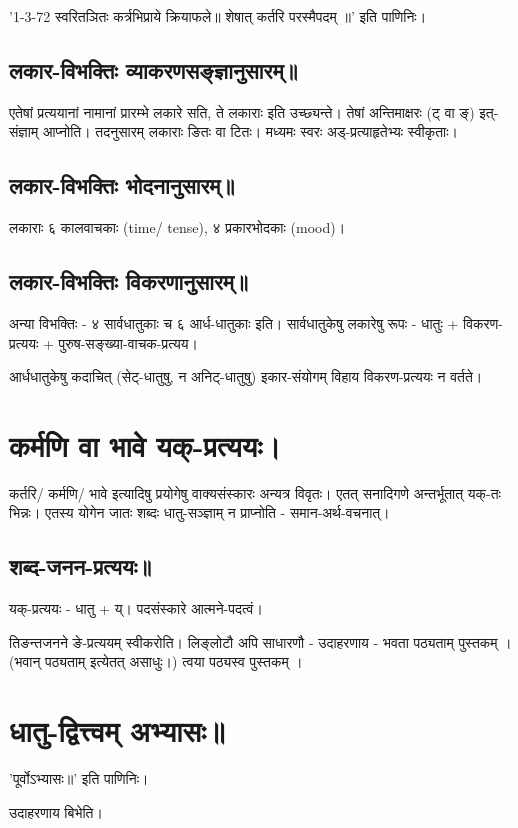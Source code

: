\documentclass[oneside, article]{memoir}
\begin{document}
'1-3-72 स्वरितञितः कर्त्रभिप्राये क्रियाफले॥ शेषात् कर्तरि परस्मैपदम् ॥' इति पाणिनिः।

\subsection{लकार-विभक्तिः व्याकरणसङ्ज्ञानुसारम्॥}
एतेषां प्रत्ययानां नामानां प्रारम्भे लकारे सति, ते लकाराः इति उच्छ्यन्ते। तेषां अन्तिमाक्षरः (ट् वा ङ्) इत्-संज्ञाम् आप्नोति। तदनुसारम् लकाराः ङितः वा टितः। मध्यमः स्वरः अड्-प्रत्याहृतेभ्यः स्वीकृताः।

\subsection{लकार-विभक्तिः भोदनानुसारम्॥}
लकाराः ६ कालवाचकाः (time/ tense), ४ प्रकारभोदकाः (mood)।

\subsection{लकार-विभक्तिः विकरणानुसारम्॥}
अन्या विभक्तिः - ४ सार्वधातुकाः च ६ आर्ध-धातुकाः इति।
सार्वधातुकेषु लकारेषु रूपः - धातुः + विकरण-प्रत्ययः + पुरुष-सङ्ख्या-वाचक-प्रत्यय।

आर्धधातुकेषु कदाचित् (सेट्-धातुषु, न अनिट्-धातुषु) इकार-संयोगम् विहाय विकरण-प्रत्ययः न वर्तते।

\section{कर्मणि वा भावे यक्-प्रत्ययः।}
कर्तरि/ कर्मणि/ भावे इत्यादिषु प्रयोगेषु वाक्यसंस्कारः अन्यत्र विवृतः। एतत् सनादिगणे अन्तर्भूतात् यक्-तः भिन्नः। एतस्य योगेन जातः शब्दः धातु-सञ्ज्ञाम् न प्राप्नोति - समान-अर्थ-वचनात्।

\subsection{शब्द-जनन-प्रत्ययः॥}
यक्-प्रत्ययः - धातु + य्। पदसंस्कारे आत्मने-पदत्वं।

तिङन्तजनने ङे-प्रत्ययम् स्वीकरोति। लिङ्लोटौ अपि साधारणौ - उदाहरणाय - भवता पठ्यताम् पुस्तकम् । (भवान् पठ्यताम् इत्येतत् असाधुः।) त्वया पठ्यस्व पुस्तकम् ।

\section{धातु-द्वित्त्वम् अभ्यासः॥}
'पूर्वोऽभ्यासः॥' इति पाणिनिः।

उदाहरणाय बिभेति।
\end{document}
